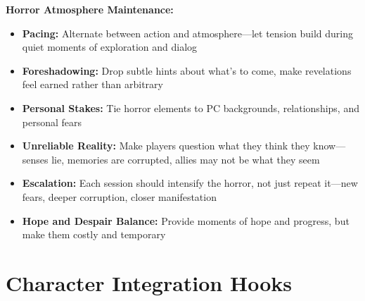 \documentclass[11pt]{article}
\begin{document}
\textbf{Horror Atmosphere Maintenance:}
\begin{itemize}
\item \textbf{Pacing:} Alternate between action and atmosphere---let tension build during quiet moments of exploration and dialog
\item \textbf{Foreshadowing:} Drop subtle hints about what's to come, make revelations feel earned rather than arbitrary
\item \textbf{Personal Stakes:} Tie horror elements to PC backgrounds, relationships, and personal fears
\item \textbf{Unreliable Reality:} Make players question what they think they know---senses lie, memories are corrupted, allies may not be what they seem
\item \textbf{Escalation:} Each session should intensify the horror, not just repeat it---new fears, deeper corruption, closer manifestation
\item \textbf{Hope and Despair Balance:} Provide moments of hope and progress, but make them costly and temporary
\end{itemize}

\section{Character Integration Hooks}
\end{document}
